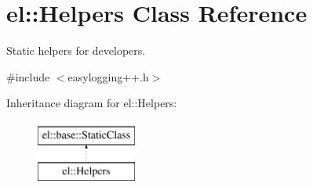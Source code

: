 \hypertarget{classel_1_1Helpers}{\section{el\-:\-:Helpers Class Reference}
\label{classel_1_1Helpers}
}


Static helpers for developers.  




{\ttfamily \#include $<$easylogging++.\-h$>$}

Inheritance diagram for el\-:\-:Helpers\-:\begin{figure}[H]
\begin{center}
\leavevmode
\includegraphics[height=2.000000cm]{classel_1_1Helpers}
\end{center}
\end{figure}
